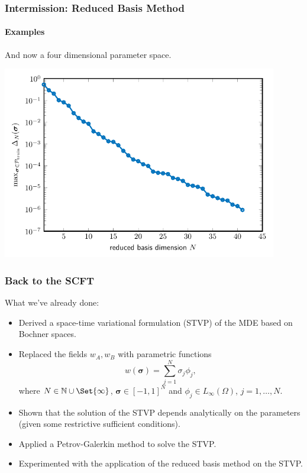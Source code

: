 \begin{frame}[t]
    \frametitle{Intermission: Reduced Basis Method}
    \framesubtitle{Examples}

    And now a four dimensional parameter space.

    \centering
    \includegraphics[width=0.9\textwidth]{figures/ch5ex2_rbm_error.pdf}
\end{frame}


\begin{frame}[t]
    \frametitle{Back to the SCFT}

    What we've already done:

    \begin{itemize}
        \item<1-> Derived a space-time variational formulation (STVP) of the MDE based on Bochner spaces.
        \item<2-> Replaced the fields $w_A, w_B$ with parametric functions
        \begin{equation}
            w(\bm \sigma) = \sum_{j = 1}^{N} \sigma_{j} \phi_{j},
        \end{equation}
        where $N \in \mathbb{N} \cup \Set{ \infty }$, $\bm \sigma \in [-1, 1]^{N}$ and $\phi_{j} \in L_{\infty}(\Omega)$, $j = 1, \dots, N$.
        \item<2-> Shown that the solution of the STVP depends analytically on the parameters (given some restrictive sufficient conditions).
        \item<3-> Applied a Petrov-Galerkin method to solve the STVP.
        \item<3-> Experimented with the application of the reduced basis method on the STVP.
    \end{itemize}

\end{frame}

